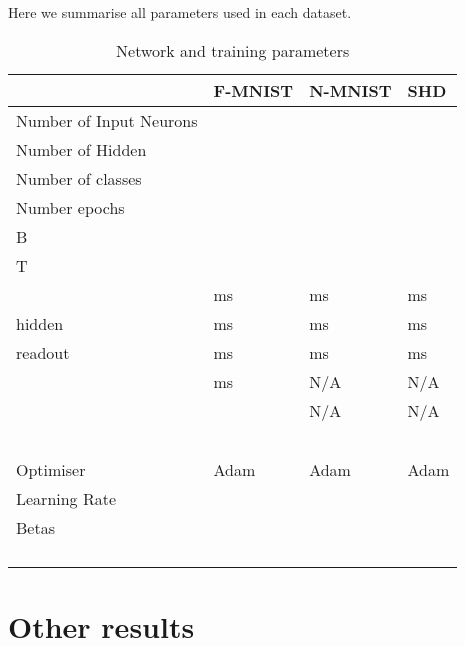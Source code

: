 \documentclass{article}
\begin{document}
Here we summarise all parameters used in each dataset.

\begin{table}[h]
  \centering
  \begin{tabular}{llll}
    \toprule
                                & F-MNIST & N-MNIST & SHD \\
    \midrule
    Number of Input Neurons     &  &  &   \\
    Number of Hidden            &  &  &   \\
    Number of classes           &  &  &   \\
    Number epochs               &  &  &   \\
    B                           &  &  &   \\
    T                           &  &  &    \\
                      & ms & ms & ms  \\
     hidden               & ms & ms & ms  \\
     readout              & ms & ms & ms  \\
             & ms & N/A & N/A  \\
                        &  & N/A & N/A  \\
                         &  &  &   \\
                      &  &  &   \\
                        &  &  &   \\
                        &  &  &   \\
                         &  &  &   \\
    Optimiser                   & Adam & Adam & Adam  \\
    Learning Rate               &  & &   \\
    Betas                       &  &  &     \\
               &  &  &    \\
                   &  &  &   \\
                &  &  &    \\
                    &  &  &    \\
    \bottomrule
  \end{tabular}
  \caption{Network and training parameters}
\end{table}

\clearpage
\newpage
\section{Other results} \label{supp:other results}
\end{document}

